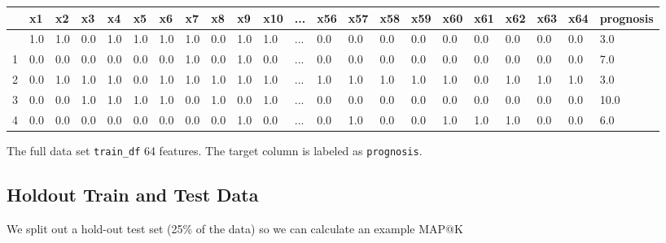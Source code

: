 \documentclass[
  letterpaper,
  DIV=11,
  numbers=noendperiod]{scrreprt}
\begin{document}
\begin{longtable}[]{@{}llllllllllllllllllllll@{}}
\toprule\noalign{}
& x1 & x2 & x3 & x4 & x5 & x6 & x7 & x8 & x9 & x10 & ... & x56 & x57 &
x58 & x59 & x60 & x61 & x62 & x63 & x64 & prognosis \\
\midrule\noalign{}
\endhead
\bottomrule\noalign{}
\endlastfoot
0 & 1.0 & 1.0 & 0.0 & 1.0 & 1.0 & 1.0 & 1.0 & 0.0 & 1.0 & 1.0 & ... &
0.0 & 0.0 & 0.0 & 0.0 & 0.0 & 0.0 & 0.0 & 0.0 & 0.0 & 3.0 \\
1 & 0.0 & 0.0 & 0.0 & 0.0 & 0.0 & 0.0 & 1.0 & 0.0 & 1.0 & 0.0 & ... &
0.0 & 0.0 & 0.0 & 0.0 & 0.0 & 0.0 & 0.0 & 0.0 & 0.0 & 7.0 \\
2 & 0.0 & 1.0 & 1.0 & 1.0 & 0.0 & 1.0 & 1.0 & 1.0 & 1.0 & 1.0 & ... &
1.0 & 1.0 & 1.0 & 1.0 & 1.0 & 0.0 & 1.0 & 1.0 & 1.0 & 3.0 \\
3 & 0.0 & 0.0 & 1.0 & 1.0 & 1.0 & 1.0 & 0.0 & 1.0 & 0.0 & 1.0 & ... &
0.0 & 0.0 & 0.0 & 0.0 & 0.0 & 0.0 & 0.0 & 0.0 & 0.0 & 10.0 \\
4 & 0.0 & 0.0 & 0.0 & 0.0 & 0.0 & 0.0 & 0.0 & 0.0 & 1.0 & 0.0 & ... &
0.0 & 1.0 & 0.0 & 0.0 & 1.0 & 1.0 & 1.0 & 0.0 & 0.0 & 6.0 \\
\end{longtable}

The full data set \texttt{train\_df} 64 features. The target column is
labeled as \texttt{prognosis}.

\hypertarget{holdout-train-and-test-data}{%
\subsection{Holdout Train and Test
Data}\label{holdout-train-and-test-data}}

We split out a hold-out test set (25\% of the data) so we can calculate
an example MAP@K
\end{document}
